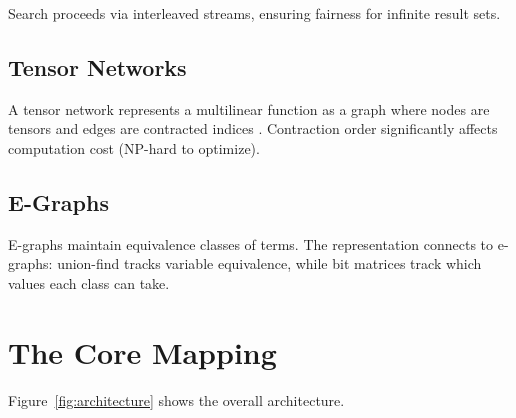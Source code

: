\documentclass[11pt,a4paper]{article}
\begin{document}
Search proceeds via interleaved streams, ensuring fairness for infinite result sets.

\subsection{Tensor Networks}

A tensor network represents a multilinear function as a graph where nodes are tensors and edges are contracted indices \cite{tensor_networks_intro_chirho}.
Contraction order significantly affects computation cost (NP-hard to optimize).

\subsection{E-Graphs}

E-graphs \cite{egg_chirho} maintain equivalence classes of terms.
The representation connects to e-graphs: union-find tracks variable equivalence, while bit matrices track which values each class can take.

\section{The Core Mapping}

Figure~\ref{fig:architecture} shows the overall architecture.
\end{document}
